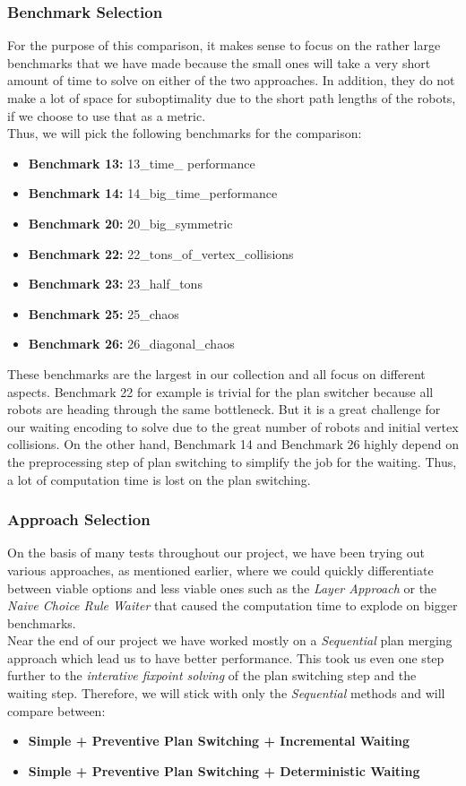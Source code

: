 \documentclass{llncs}
\begin{document}
\subsubsection{Benchmark Selection}
For the purpose of this comparison, it makes sense to focus on the rather large benchmarks that we have made because the small ones will take a very short amount of time to solve on either of the two approaches. In addition, they do not make a lot of space for suboptimality due to the short path lengths of the robots, if we choose to use that as a metric.\\
Thus, we will pick the following benchmarks for the comparison:
\begin{itemize}
    \item \textbf{Benchmark 13:} 13\_time\_ performance
    \item \textbf{Benchmark 14:} 14\_big\_time\_performance
    \item \textbf{Benchmark 20:} 20\_big\_symmetric
    \item \textbf{Benchmark 22:} 22\_tons\_of\_vertex\_collisions
    \item \textbf{Benchmark 23:} 23\_half\_tons
    \item \textbf{Benchmark 25:} 25\_chaos
    \item \textbf{Benchmark 26:} 26\_diagonal\_chaos
\end{itemize}

These benchmarks are the largest in our collection and all focus on different aspects. Benchmark 22 for example is trivial for the plan switcher because all robots are heading through the same bottleneck. But it is a great challenge for our waiting encoding to solve due to the great number of robots and initial vertex collisions. On the other hand, Benchmark 14 and Benchmark 26 highly depend on the preprocessing step of plan switching to simplify the job for the waiting. Thus, a lot of computation time is lost on the plan switching.


\subsubsection{Approach Selection}
On the basis of many tests throughout our project, we have been trying out various approaches, as mentioned earlier, where we could quickly differentiate between viable options and less viable ones such as the \emph{Layer Approach} or the \emph{Naive Choice Rule Waiter} that caused the computation time to explode on bigger benchmarks.\\
Near the end of our project we have worked mostly on a \emph{Sequential} plan merging approach which lead us to have better performance. This took us even one step further to the \emph{interative fixpoint solving} of the plan switching step and the waiting step.
Therefore, we will stick with only the \emph{Sequential} methods and will compare between:
\begin{itemize}
    \item \textbf{Simple + Preventive Plan Switching + Incremental Waiting}
    \item \textbf{Simple + Preventive Plan Switching + Deterministic Waiting}
\end{itemize}
\end{document}
